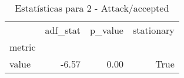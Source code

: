 \begin{table}[htbp]
\caption{Estatísticas para 2 - Attack/accepted}
\label{tab:2_-_attack_accepted_adf_test}
\begin{tabular}{lrrr}
\toprule
 & adf_stat & p_value & stationary \\
metric &  &  &  \\
\midrule
value & -6.57 & 0.00 & True \\
\bottomrule
\end{tabular}
\end{table}
